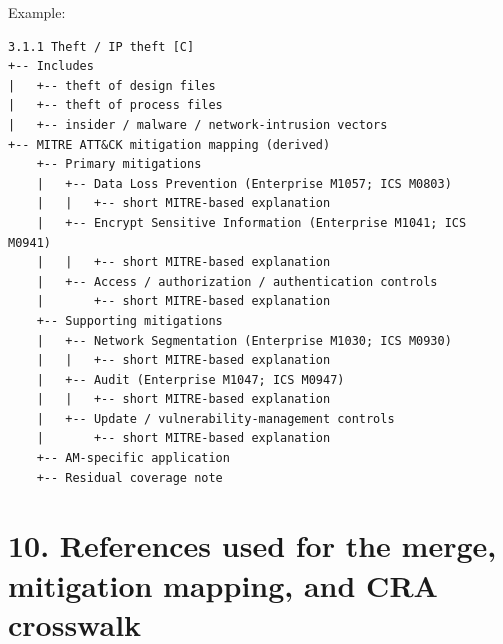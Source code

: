 \documentclass[10pt,a4paper,oneside]{report}
\begin{document}
Example:

\begin{Verbatim}[fontsize=\small,breaklines=true,breakanywhere=true]
3.1.1 Theft / IP theft [C]
+-- Includes
|   +-- theft of design files
|   +-- theft of process files
|   +-- insider / malware / network-intrusion vectors
+-- MITRE ATT&CK mitigation mapping (derived)
    +-- Primary mitigations
    |   +-- Data Loss Prevention (Enterprise M1057; ICS M0803)
    |   |   +-- short MITRE-based explanation
    |   +-- Encrypt Sensitive Information (Enterprise M1041; ICS M0941)
    |   |   +-- short MITRE-based explanation
    |   +-- Access / authorization / authentication controls
    |       +-- short MITRE-based explanation
    +-- Supporting mitigations
    |   +-- Network Segmentation (Enterprise M1030; ICS M0930)
    |   |   +-- short MITRE-based explanation
    |   +-- Audit (Enterprise M1047; ICS M0947)
    |   |   +-- short MITRE-based explanation
    |   +-- Update / vulnerability-management controls
    |       +-- short MITRE-based explanation
    +-- AM-specific application
    +-- Residual coverage note
\end{Verbatim}


\chapter{10. References used for the merge, mitigation mapping, and CRA crosswalk}
\end{document}
